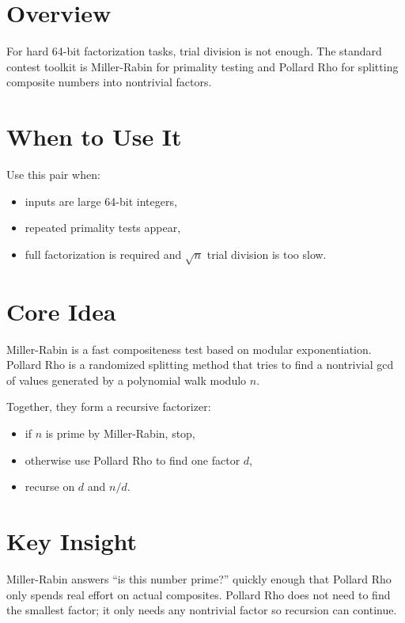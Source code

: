 \section*{Overview}

For hard 64-bit factorization tasks, trial division is not enough. The standard contest toolkit is Miller-Rabin for
primality testing and Pollard Rho for splitting composite numbers into nontrivial factors.

\section*{When to Use It}

Use this pair when:

\begin{itemize}
  \item inputs are large 64-bit integers,
  \item repeated primality tests appear,
  \item full factorization is required and \(\sqrt{n}\) trial division is too slow.
\end{itemize}

\section*{Core Idea}

Miller-Rabin is a fast compositeness test based on modular exponentiation. Pollard Rho is a randomized splitting method
that tries to find a nontrivial gcd of values generated by a polynomial walk modulo \(n\).

Together, they form a recursive factorizer:

\begin{itemize}
  \item if \(n\) is prime by Miller-Rabin, stop,
  \item otherwise use Pollard Rho to find one factor \(d\),
  \item recurse on \(d\) and \(n/d\).
\end{itemize}

\section*{Key Insight}

Miller-Rabin answers ``is this number prime?'' quickly enough that Pollard Rho only spends real effort on actual
composites. Pollard Rho does not need to find the smallest factor; it only needs any nontrivial factor so recursion can
continue.

